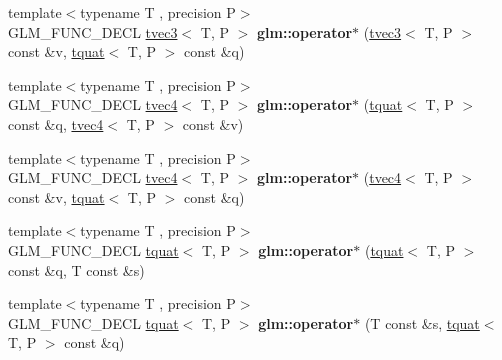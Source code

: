 \begin{DoxyCompactItemize}
\item 
\mbox{\label{group__gtc__quaternion_ga50c2d33dcb9f15b0f5d98792b3e1e032}} 
{\footnotesize template$<$typename T , precision P$>$ }\\G\+L\+M\+\_\+\+F\+U\+N\+C\+\_\+\+D\+E\+CL \hyperlink{structglm_1_1tvec3}{tvec3}$<$ T, P $>$ {\bfseries glm\+::operator$\ast$} (\hyperlink{structglm_1_1tvec3}{tvec3}$<$ T, P $>$ const \&v, \hyperlink{structglm_1_1tquat}{tquat}$<$ T, P $>$ const \&q)
\item 
\mbox{\label{group__gtc__quaternion_ga9d357fdc77ba47452414506d5f20412b}} 
{\footnotesize template$<$typename T , precision P$>$ }\\G\+L\+M\+\_\+\+F\+U\+N\+C\+\_\+\+D\+E\+CL \hyperlink{structglm_1_1tvec4}{tvec4}$<$ T, P $>$ {\bfseries glm\+::operator$\ast$} (\hyperlink{structglm_1_1tquat}{tquat}$<$ T, P $>$ const \&q, \hyperlink{structglm_1_1tvec4}{tvec4}$<$ T, P $>$ const \&v)
\item 
\mbox{\label{group__gtc__quaternion_gae43874014121a7032e6f5d178cb66593}} 
{\footnotesize template$<$typename T , precision P$>$ }\\G\+L\+M\+\_\+\+F\+U\+N\+C\+\_\+\+D\+E\+CL \hyperlink{structglm_1_1tvec4}{tvec4}$<$ T, P $>$ {\bfseries glm\+::operator$\ast$} (\hyperlink{structglm_1_1tvec4}{tvec4}$<$ T, P $>$ const \&v, \hyperlink{structglm_1_1tquat}{tquat}$<$ T, P $>$ const \&q)
\item 
\mbox{\label{group__gtc__quaternion_ga64f3ff448c382fd6642eafddd6ff65ea}} 
{\footnotesize template$<$typename T , precision P$>$ }\\G\+L\+M\+\_\+\+F\+U\+N\+C\+\_\+\+D\+E\+CL \hyperlink{structglm_1_1tquat}{tquat}$<$ T, P $>$ {\bfseries glm\+::operator$\ast$} (\hyperlink{structglm_1_1tquat}{tquat}$<$ T, P $>$ const \&q, T const \&s)
\item 
\mbox{\label{group__gtc__quaternion_ga8b18b7e92f80b6b26550a1035bca33ba}} 
{\footnotesize template$<$typename T , precision P$>$ }\\G\+L\+M\+\_\+\+F\+U\+N\+C\+\_\+\+D\+E\+CL \hyperlink{structglm_1_1tquat}{tquat}$<$ T, P $>$ {\bfseries glm\+::operator$\ast$} (T const \&s, \hyperlink{structglm_1_1tquat}{tquat}$<$ T, P $>$ const \&q)
\item 

\end{DoxyCompactItemize}
